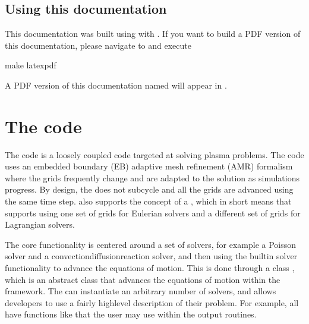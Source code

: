 \documentclass[letterpaper,10pt,english]{sphinxmanual}
\begin{document}
\subsection{Using this documentation}
\label{\detokenize{GettingStarted:using-this-documentation}}
This documentation was built using  with . If you want to build a PDF version of this documentation, please navigate to  and execute

\begin{sphinxVerbatim}[commandchars=\\\{\},formatcom=\scriptsize]
make latexpdf
\end{sphinxVerbatim}

A PDF version of this documentation named  will appear in .


\section{The  code}
\label{\detokenize{Model:the-plasmac-code}}\label{\detokenize{Model:chap-model}}\label{\detokenize{Model::doc}}
The  code is a loosely coupled code targeted at solving plasma problems.
The code uses an embedded boundary (EB) adaptive mesh refinement (AMR) formalism where the grids frequently change and are adapted to the solution as simulations progress.
By design, the  does not subcycle and all the grids are advanced using the same time step.
 also supports the concept of a {\hyperref[\detokenize{Realm:chap-realm}]{}}, which in short means that  supports using one set of grids for Eulerian solvers and a different set of grids for Lagrangian solvers.

The core functionality is centered around a set of solvers, for example a Poisson solver and a convection\sphinxhyphen{}diffusion\sphinxhyphen{}reaction solver, and then using the built\sphinxhyphen{}in solver functionality to advance the equations of motion.
This is done through a class , which is an abstract class that advances the equations of motion within the  framework.
The  can instantiate an arbitrary number of solvers, and allows developers to use a fairly high\sphinxhyphen{}level description of their problem.
For example, all  have functions like  that the user may use within the  output routines.
\end{document}
